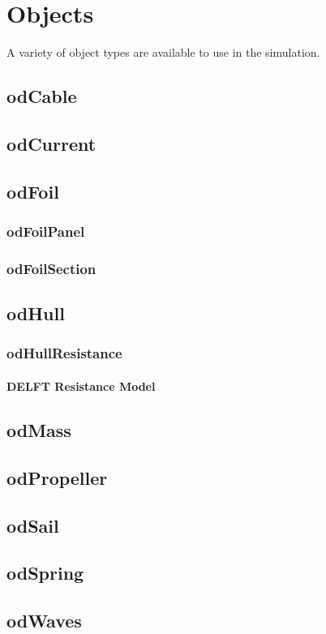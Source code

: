 \chapter{Objects}
A variety of object types are available to use in the simulation.

\section{odCable}
\section{odCurrent}
\section{odFoil}
\subsection{odFoilPanel}
\subsection{odFoilSection}
\section{odHull}
\subsection{odHullResistance}
\subsubsection{DELFT Resistance Model}
\section{odMass}
\section{odPropeller}
\section{odSail}
\section{odSpring}
\section{odWaves}